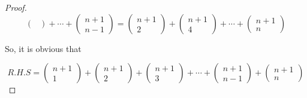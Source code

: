 \documentclass[12pt]{article}
\begin{document}
\begin{proof}
\[\begin{pmatrix}
          \end{pmatrix} + \cdots + \begin{pmatrix}
                                       n+1 \\
                                       n-1 
    
          \end{pmatrix} 
            =  \begin{pmatrix}
            n+1  \\
            2
        \end{pmatrix}  + \begin{pmatrix}
                  n+1 \\
                  4
              
              \end{pmatrix} + \cdots + \begin{pmatrix}
                                           n+1 \\
                                           n 
        
             
              \end{pmatrix} \]

    \vspace*{0.3cm}
    \hspace*{1.2cm}
    So, it is obvious that

    \[ R.H.S   = \begin{pmatrix}
        n+1  \\
        1
    \end{pmatrix}  + \begin{pmatrix}
              n+1 \\
              2
          
          \end{pmatrix} +  \begin{pmatrix}
                                       n+1 \\
                                       3 
    
          \end{pmatrix} 
           + \cdots + \begin{pmatrix}
                  n+1 \\
                  n-1
              
              \end{pmatrix} + \begin{pmatrix}
                                           n+1 \\
                                           n 
        

\end{pmatrix}\]
\end{proof}
\end{document}
